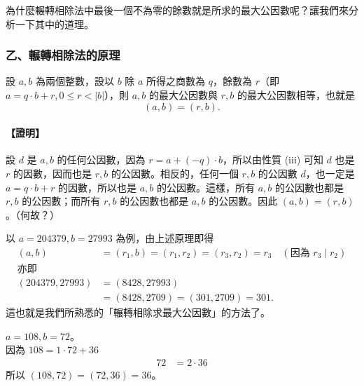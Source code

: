為什麼輾轉相除法中最後一個不為零的餘數就是所求的最大公因數呢？讓我們來分析一下其中的道理。

\subsubsection*{乙、輾轉相除法的原理}\label{subsec:6-2-b}

設 $a, b$ 為兩個整數，設以 $b$ 除 $a$ 所得之商數為 $q$，餘數為 $r$（即 $a = q \cdot b + r, 0 \le r < |b|$），則 $a, b$ 的最大公因數與 $r, b$ 的最大公因數相等，也就是
\begin{equation*}
  (a, b) = (r, b).
\end{equation*}

\paragraph{【證明】}
設 $d$ 是 $a, b$ 的任何公因數，因為 $r = a + (-q) \cdot b$，所以由性質 (iii) 可知 $d$ 也是 $r$ 的因數，因而也是 $r, b$ 的公因數。相反的，任何一個 $r, b$ 的公因數 $d$，也一定是 $a = q \cdot b + r$ 的因數，所以也是 $a, b$ 的公因數。這樣，所有 $a, b$ 的公因數也都是 $r, b$ 的公因數；而所有 $r, b$ 的公因數也都是 $a, b$ 的公因數。因此 $(a, b) = (r, b)$。（何故？）\label{note:ch6-why-euclid}

\begin{example}\label{ex:6-2-1}
以 $a=204379, b=27993$ 為例，由上述原理即得
\begin{align*}
  (a, b) &= (r_1, b) = (r_1, r_2) = (r_3, r_2) = r_3 \quad (\text{因為 } r_3 \mid r_2) \\
  \text{亦即} \\
  (204379, 27993) &= (8428, 27993) \\
  &= (8428, 2709) = (301, 2709) = 301.
\end{align*}
這也就是我們所熟悉的「輾轉相除求最大公因數」的方法了。
\end{example}

\begin{example}\label{ex:6-2-2}
$a=108, b=72$。\\
因為 $108 = 1 \cdot 72 + 36$
\begin{align*}
  72 &= 2 \cdot 36
\end{align*}
所以 $(108, 72) = (72, 36) = 36$。
\end{example}

